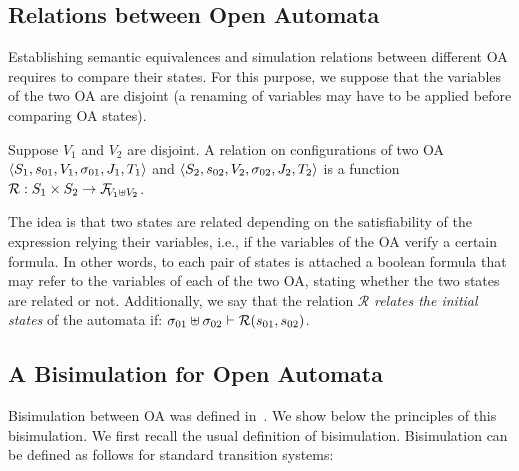 \documentclass[runningheads]{llncs}
\begin{document}
\subsection{Relations between Open Automata}
Establishing semantic equivalences and simulation relations between different OA requires  to compare their states. For this purpose, we suppose that the variables of the two OA are disjoint (a renaming of variables may have to be applied before comparing OA states).
\begin{definition} Suppose $V_1$ and $V_2$ are disjoint.
A relation on configurations of two OA \(\OAg[1]\) and \(\OAg[2]\) is a function \( \mathcal{R}: S_1 \times S_2 \to \rformulas[V_1 \uplus V_2]\).
\end{definition}
The idea is that two states are related depending on the satisfiability of the expression relying their variables, i.e., if the variables of the OA verify a certain formula. 
In other words, to each pair of states is attached a boolean formula that may refer to the  variables of each of the two OA, stating whether the two states are related or not.
Additionally, we say that the relation $ \mathcal{R}$ \emph{relates the initial states} of the automata if: \(\sigma_{01} \uplus \sigma_{02} \vdash  \mathcal{R}\mpar{s_{01}, s_{02}}\).


\subsection{A Bisimulation for Open Automata}

Bisimulation between OA was defined in~\cite{AMHEEMA:2023}.  We show below the principles of this bisimulation. We first recall the usual definition of bisimulation.
Bisimulation can  be defined as follows for standard transition systems: 
\end{document}
